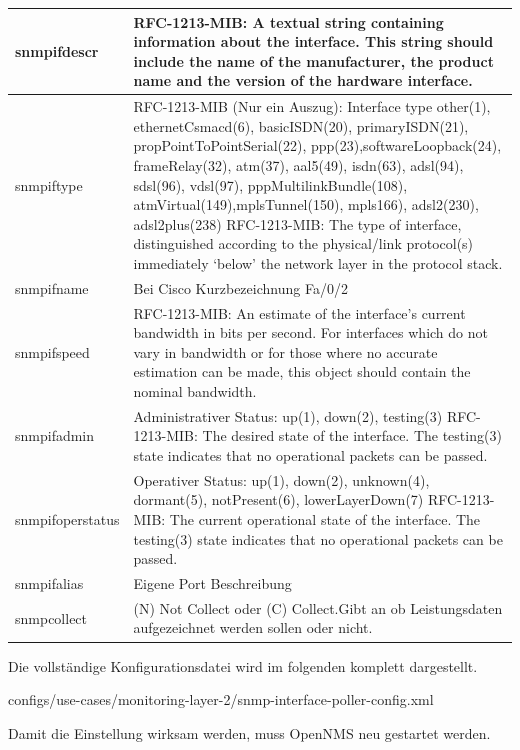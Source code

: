 \begin{longtable}{|p{3.5cm}|p{11cm}|}
  	\hline
  	snmpifdescr    &    RFC-1213-MIB: A textual string containing information about the interface.  This string should include the name of the manufacturer, the product name and the version of the hardware interface. \\
  	\hline
  	snmpiftype    &    RFC-1213-MIB (Nur ein Auszug): Interface type
other(1), ethernetCsmacd(6), basicISDN(20), primaryISDN(21), propPointToPointSerial(22), ppp(23),softwareLoopback(24), frameRelay(32), atm(37), aal5(49), isdn(63), adsl(94), sdsl(96), vdsl(97), pppMultilinkBundle(108), atmVirtual(149),mplsTunnel(150), mpls166), adsl2(230), adsl2plus(238)
RFC-1213-MIB: The type of interface, distinguished according to the physical/link protocol(s) immediately `below' the network layer in the protocol stack. \\
    \hline
    snmpifname    &    Bei Cisco Kurzbezeichnung Fa/0/2 \\
    \hline
    snmpifspeed    &    RFC-1213-MIB:  An estimate of the interface's current bandwidth in bits per second.  For interfaces which do not vary in bandwidth or for those where no accurate estimation can be made, this object should contain the nominal bandwidth. \\
    \hline
    snmpifadmin    &    Administrativer Status: up(1), down(2), testing(3)
RFC-1213-MIB: The desired state of the interface.  The testing(3) state indicates that no operational packets can be passed. \\
    \hline
    snmpifoperstatus    &    Operativer Status: up(1), down(2), unknown(4), dormant(5), notPresent(6), lowerLayerDown(7)
RFC-1213-MIB: The current operational state of the interface. The testing(3) state indicates that no operational packets can be passed. \\
    \hline
    snmpifalias    &    Eigene Port Beschreibung \\
    \hline
    snmpcollect    &    (N) Not Collect oder (C) Collect.Gibt an ob Leistungsdaten aufgezeichnet werden sollen oder nicht.
    \label{tbl:snmpifattrib}
\end{longtable}

Die vollständige Konfigurationsdatei wird im folgenden komplett dargestellt.


  {configs/use-cases/monitoring-layer-2/snmp-interface-poller-config.xml}

Damit die Einstellung wirksam werden, muss OpenNMS neu gestartet werden.

